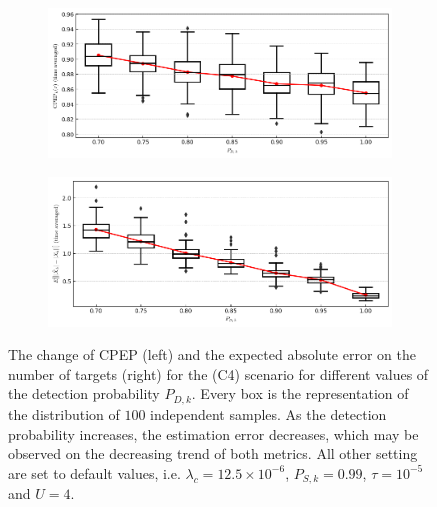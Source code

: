 \begin{figure}
    \centering
    \begin{subfigure}[]{0.48\linewidth}
        \centering
        \includegraphics[width=\linewidth]{figures/c4-pd-cpep.png}
    \end{subfigure}
    \hfill
    \begin{subfigure}[]{0.48\linewidth}
        \centering
        \includegraphics[width=\linewidth]{figures/c4-pd-eae.png}
    \end{subfigure}
  \caption[(C4). Change of performance depending on the detection probability.]{The change of CPEP (left) and the expected absolute error on the number of targets (right) for the (C4) scenario for different values of the detection probability $P_{D,k}$. Every box is the representation of the distribution of $100$ independent samples. As the detection probability increases, the estimation error decreases, which may be observed on the decreasing trend of both metrics. All other setting are set to default values, i.e. $\lambda_{c} = 12.5 \times 10^{-6}$, $P_{S,k} = 0.99$, $\tau = 10^{-5}$ and $U = 4$.}
  \label{fig:c4-pd}
\end{figure}


